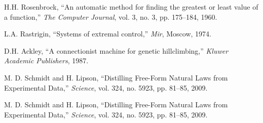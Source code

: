 \documentclass{article}
\begin{document}

\begin{thebibliography}{9}

H.H. Rosenbrock, ``An automatic method for finding the greatest or least value of a function,'' \emph{The Computer Journal}, vol. 3, no. 3, pp. 175–184, 1960.

L.A. Rastrigin, ``Systems of extremal control,'' \emph{Mir}, Moscow, 1974.

D.H. Ackley, ``A connectionist machine for genetic hillclimbing,'' \emph{Kluwer Academic Publishers}, 1987.

M. D. Schmidt and H. Lipson, ``Distilling Free-Form Natural Laws from Experimental Data,'' \emph{Science}, vol. 324, no. 5923, pp. 81–85, 2009.

M. D. Schmidt and H. Lipson, ``Distilling Free-Form Natural Laws from Experimental Data,'' \emph{Science}, vol. 324, no. 5923, pp. 81–85, 2009.

\end{thebibliography}
\end{document}
